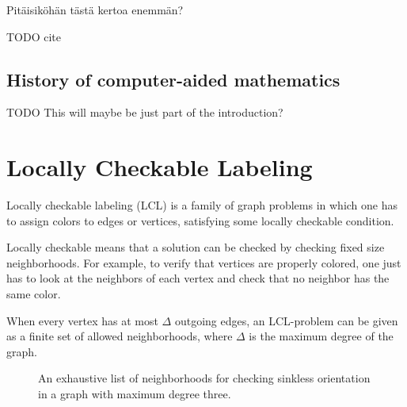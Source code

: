 \documentclass[english, 12pt, a4paper, sci, a-1b, online]{aaltothesis}
\begin{document}
Pitäisiköhän tästä kertoa enemmän?

TODO cite

\subsection{History of computer-aided mathematics}

TODO This will maybe be just part of the introduction?

\section{Locally Checkable Labeling}

Locally checkable labeling (LCL) is a family of graph problems in which one has to assign colors to edges or vertices, satisfying some locally checkable condition.~\cite{LCL}

Locally checkable means that a solution can be checked by checking fixed size neighborhoods. For example, to verify that vertices are properly colored, one just has to look at the neighbors of each vertex and check that no neighbor has the same color.

When every vertex has at most $\Delta$ outgoing edges, an LCL-problem can be given as a finite set of allowed neighborhoods, where $\Delta$ is the maximum degree of the graph.

\newcommand\tick{\fill[scale=0.6, color=black!40!green](0,.35) -- (.25,0) -- (1,.7) -- (.25,.15) -- cycle;}
\newcommand\cross{\draw[scale=0.3, very thick, color=red] (0,0) -- (1, 1) {} (0, 1) -- (1, 0) {};}

\begin{figure}[h]
\centering
{}
\caption{An exhaustive list of neighborhoods for checking sinkless orientation in a graph with maximum degree three.}
\end{figure}
\end{document}
